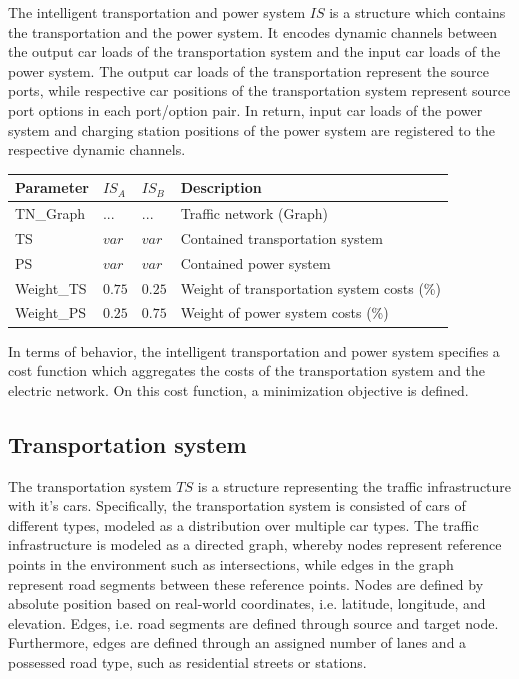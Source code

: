 The intelligent transportation and power system $IS$ is a structure which contains the transportation and the power system. It encodes dynamic channels between the output car loads of the transportation system and the input car loads of the power system. The output car loads of the transportation represent the source ports, while respective car positions of the transportation system represent source port options in each port/option pair. In return, input car loads of the power system and charging station positions of the power system are registered to the respective dynamic channels. 

\begin{table}[h]
	\renewcommand{\arraystretch}{1.3}
	\centering
	\begin{tabular}{llll}
		\hline
		\textbf{Parameter}     & \textbf{$IS_{A}$} & \textbf{$IS_{B}$}       & \textbf{Description} \\ \hline
		TN\_Graph               & $...$ & $...$  	  & Traffic network (Graph)     \\
		TS     & $var$   & $var$ 	  & Contained transportation system     \\
		PS               & $var$ 	 & $var$ & Contained power system    \\
		Weight\_TS               & $0.75$  & $0.25$ & Weight of transportation system costs (\%)       \\ 
		Weight\_PS               & $0.25$  & $0.75$  		  & Weight of power system costs (\%)   \\ \hline
	\end{tabular}
\end{table}

In terms of behavior, the intelligent transportation and power system specifies a cost function which aggregates the costs of the transportation system and the electric network. On this cost function, a minimization objective is defined.

\subsection{Transportation system}

The transportation system $TS$ is a structure representing the traffic infrastructure with it's cars. Specifically, the transportation system is consisted of cars of different types, modeled as a distribution over multiple car types. The traffic infrastructure is modeled as a directed graph, whereby nodes represent reference points in the environment such as intersections, while edges in the graph represent road segments between these reference points. Nodes are defined by absolute position based on real-world coordinates, i.e. latitude, longitude, and elevation. Edges, i.e. road segments are defined through source and target node. Furthermore, edges are defined through an assigned number of lanes and a possessed road type, such as residential streets or stations.


